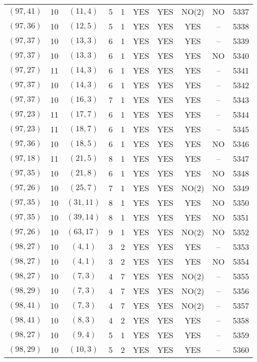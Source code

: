 \begin{longtable}{|c|c|c|c|c|c|c|c|c|c|}
$(97, 41)$ & 10 & $(11, 4)$ & 5 & 1 & YES & YES & NO(2) & NO & 5337\\
$(97, 36)$ & 10 & $(12, 5)$ & 5 & 1 & YES & YES & YES & -- & 5338\\
$(97, 37)$ & 10 & $(13, 3)$ & 6 & 1 & YES & YES & YES & -- & 5339\\
$(97, 37)$ & 10 & $(13, 3)$ & 6 & 1 & YES & YES & YES & NO & 5340\\
$(97, 27)$ & 11 & $(14, 3)$ & 6 & 1 & YES & YES & YES & -- & 5341\\
$(97, 37)$ & 10 & $(14, 3)$ & 6 & 1 & YES & YES & YES & -- & 5342\\
$(97, 37)$ & 10 & $(16, 3)$ & 7 & 1 & YES & YES & YES & -- & 5343\\
$(97, 23)$ & 11 & $(17, 7)$ & 6 & 1 & YES & YES & YES & -- & 5344\\
$(97, 23)$ & 11 & $(18, 7)$ & 6 & 1 & YES & YES & YES & -- & 5345\\
$(97, 36)$ & 10 & $(18, 5)$ & 6 & 1 & YES & YES & YES & NO & 5346\\
$(97, 18)$ & 11 & $(21, 5)$ & 8 & 1 & YES & YES & YES & -- & 5347\\
$(97, 35)$ & 10 & $(21, 8)$ & 6 & 1 & YES & YES & YES & NO & 5348\\
$(97, 26)$ & 10 & $(25, 7)$ & 7 & 1 & YES & YES & NO(2) & NO & 5349\\
$(97, 35)$ & 10 & $(31, 11)$ & 8 & 1 & YES & YES & YES & NO & 5350\\
$(97, 35)$ & 10 & $(39, 14)$ & 8 & 1 & YES & YES & YES & NO & 5351\\
$(97, 26)$ & 10 & $(63, 17)$ & 9 & 1 & YES & YES & NO(2) & NO & 5352\\
$(98, 27)$ & 10 & $(4, 1)$ & 3 & 2 & YES & YES & YES & -- & 5353\\
$(98, 27)$ & 10 & $(4, 1)$ & 3 & 2 & YES & YES & YES & NO & 5354\\
$(98, 27)$ & 10 & $(7, 3)$ & 4 & 7 & YES & YES & NO(2) & -- & 5355\\
$(98, 29)$ & 10 & $(7, 3)$ & 4 & 7 & YES & YES & NO(2) & -- & 5356\\
$(98, 41)$ & 10 & $(7, 3)$ & 4 & 7 & YES & YES & NO(2) & -- & 5357\\
$(98, 41)$ & 10 & $(8, 3)$ & 4 & 2 & YES & YES & YES & -- & 5358\\
$(98, 27)$ & 10 & $(9, 4)$ & 5 & 1 & YES & YES & YES & -- & 5359\\
$(98, 29)$ & 10 & $(10, 3)$ & 5 & 2 & YES & YES & YES & -- & 5360\\

\end{longtable}
